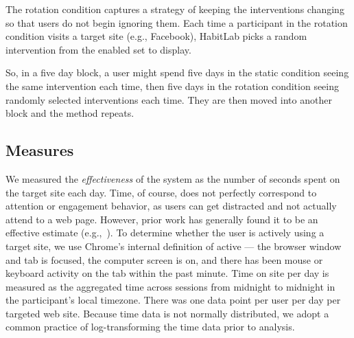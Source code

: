 The rotation condition captures a strategy of keeping the interventions changing so that users do not begin ignoring them. Each time a participant in the rotation condition visits a target site (e.g., Facebook), HabitLab picks a random intervention from the enabled set to display.

So, in a five day block, a user might spend five days in the static condition seeing the same intervention each time, then five days in the rotation condition seeing randomly selected interventions each time. They are then moved into another block and the method repeats.

\subsection{Measures}

We measured the \textit{effectiveness} of the system as the number of seconds spent on the target site each day. Time, of course, does not perfectly correspond to attention or engagement behavior, as users can get distracted and not actually attend to a web page. However, prior work has generally found it to be an effective estimate (e.g.,~\cite{whittaker2016don}). %
To determine whether the user is actively using a target site, we use Chrome's internal definition of active --- the browser window and tab is focused, the computer screen is on, and there has been mouse or keyboard activity on the tab within the past minute. 
Time on site per day is measured as the aggregated time across sessions from midnight to midnight in the participant's local timezone.
There was %
one data point per user per day per targeted web site.
Because time data is not normally distributed, we adopt a common practice of log-transforming the time data prior to analysis.



